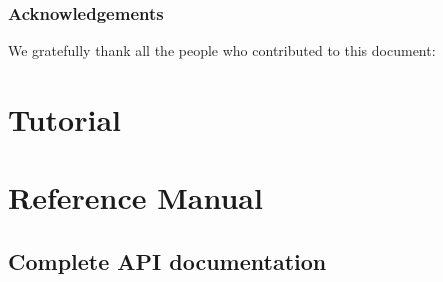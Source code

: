 \documentclass[a4paper,11pt,twoside,openright]{memoir}
\begin{document}
\section*{Acknowledgements}

We gratefully thank all the people who contributed to this document:



\part{Tutorial}





% 



\part{Reference Manual}









\chapter{Complete API documentation}
\label{chap:apidoc}





%
\end{document}
